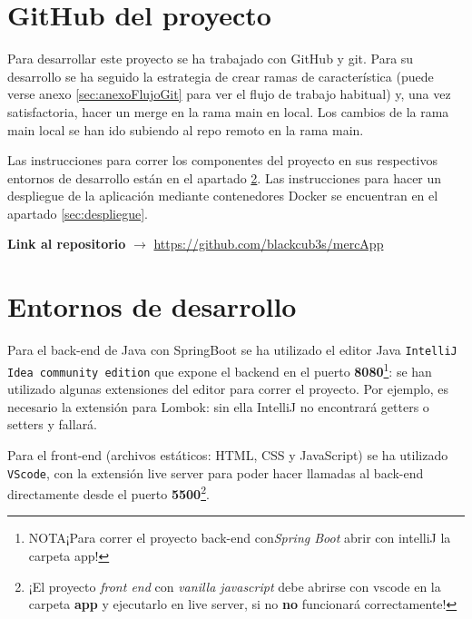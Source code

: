 \documentclass[a4paper,12pt]{report}
\begin{document}
	
	
				
			\section{GitHub del proyecto}
			
				Para desarrollar este proyecto se ha trabajado con GitHub y git. Para su desarrollo se ha seguido la estrategia de crear ramas de característica (puede verse anexo \ref{sec:anexoFlujoGit} para ver el flujo de trabajo habitual) y, una vez satisfactoria, hacer un merge en la rama main en local. Los cambios de la rama main local se han ido subiendo al repo remoto en la rama main.
				
				Las instrucciones para correr los componentes del proyecto en sus respectivos entornos de desarrollo están en el apartado \ref{sec:entornosDesarrollo}. Las instrucciones para hacer un despliegue de la aplicación mediante contenedores Docker se encuentran en el apartado \ref{sec:despliegue}.
			

			
			
			
			
				\textbf{Link al repositorio} $\rightarrow$ \href{https://github.com/blackcub3s/mercApp}{https://github.com/blackcub3s/mercApp} 
			
	
	
		
			\section{Entornos de desarrollo}
			\label{sec:entornosDesarrollo}
			
				Para el back-end de Java con SpringBoot se ha utilizado el editor Java \texttt{IntelliJ Idea community edition} que expone el backend en el puerto \textbf{8080}\footnote{NOTA¡Para correr el proyecto back-end con\textit{Spring Boot} abrir con intelliJ la carpeta app!}: se han utilizado algunas extensiones del editor para correr el proyecto. Por ejemplo, es necesario la extensión para Lombok: sin ella IntelliJ no encontrará getters o setters y fallará.
				
				Para el front-end (archivos estáticos: HTML, CSS y JavaScript) se ha utilizado \texttt{VScode}, con la extensión live server para poder hacer llamadas al back-end directamente desde el puerto \textbf{5500}\footnote{¡El proyecto \textit{front end} con \textit{vanilla javascript} debe abrirse con vscode en la carpeta \textbf{app} y ejecutarlo en live server, si no \textbf{no} funcionará correctamente!}.
				
\end{document}
